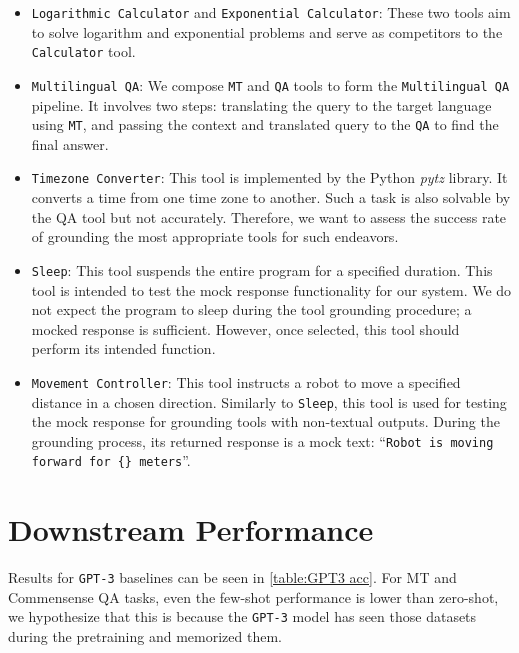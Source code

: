 \documentclass[11pt]{article}
\newcommand{\llm}{\textcolor{darkredTwo}{LLM}}
\newcommand{\name}{{\fontfamily{cmss}\selectfont GEAR}}
\newcommand{\calc}{{\tt Calculator}}
\newcommand{\mt}{{\tt MT}}
\newcommand{\qa}{{\tt QA}}
\newcommand{\mlqa}{{\tt Multilingual QA}}
\newcommand{\tz}{{\tt Timezone Converter}}
\newcommand{\expcalc}{{\tt Exponential Calculator}}
\newcommand{\logcalc}{{\tt Logarithmic Calculator}}
\newcommand{\sleep}{{\tt Sleep}}
\newcommand{\map}{{\tt Movement Controller}}
\newcommand{\gptThree}{{\tt \textcolor{darkredTwo}{GPT-3}}}
\begin{document}
\begin{itemize}[leftmargin=0.1in]
    \item \logcalc{} and \expcalc{}: These two tools aim to solve logarithm and exponential problems and serve as competitors to the \calc{} tool.
    \item \mlqa{}: We compose \mt{} and \qa{} tools to form the \mlqa{} pipeline. It involves two steps: translating the query to the target language using \mt{}, and passing the context and translated query to the \qa{} to find the final answer.
    \item \tz{}: This tool is implemented by the Python \textit{pytz} library. It converts a time from one time zone to another. Such a task is also solvable by the QA tool but not accurately. Therefore, we want to assess the success rate of grounding the most appropriate tools for such endeavors.
    \item \sleep{}: This tool suspends the entire program for a specified duration. This tool is intended to test the mock response functionality for our system. We do not expect the program to sleep during the tool grounding procedure; a mocked response is sufficient. However, once selected, this tool should perform its intended function.
    \item \map{}: This tool instructs a robot to move a specified distance in a chosen direction. Similarly to \sleep{}, this tool is used for testing the mock response for grounding tools with non-textual outputs. During the grounding process, its returned response is a mock text: ``\texttt{Robot is moving forward for \{\} meters}''. 
\end{itemize}
\label{Appendix: novel tools}

\clearpage
\section{Downstream Performance}
\label{Appendix: Performance Experiment}
Results for \gptThree{} baselines can be seen in \autoref{table:GPT3 acc}. For MT and Commensense QA tasks, even the few-shot performance is lower than zero-shot, we hypothesize that this is because the \gptThree{} model has seen those datasets during the pretraining and memorized them.
\end{document}
